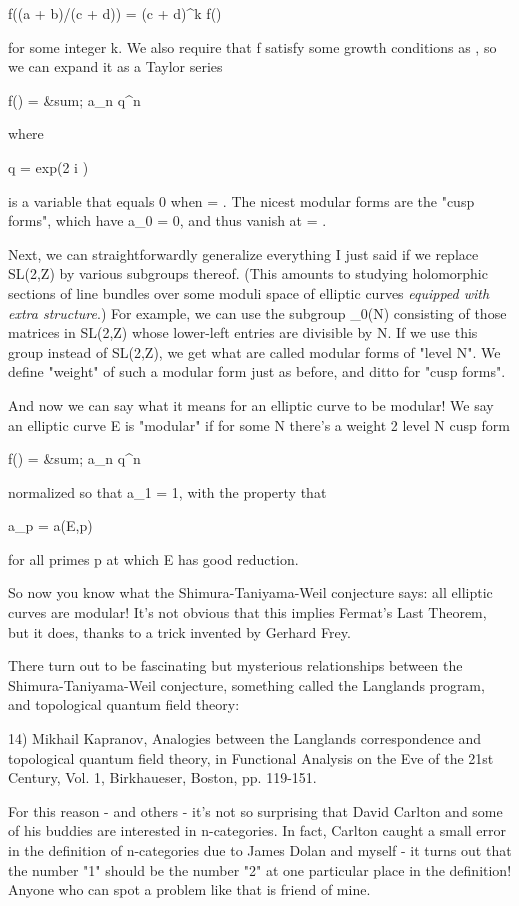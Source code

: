 f((a \tau  + b)/(c \tau  + d)) = (c \tau  + d)^{k} f(\tau )

for some integer k.   We also require that f satisfy some growth 
conditions as \tau  \to  \infty , so we can expand it as a Taylor series

f(\tau ) = &sum; a_{n} q^{n}

where 

q = exp(2 \pi  i \tau )

is a variable that equals 0 when \tau  = \infty .  The nicest modular
forms are the "cusp forms", which have a_{0} = 0,
and thus vanish at \tau  = \infty .

Next, we can straightforwardly generalize everything I just said if we
replace SL(2,Z) by various subgroups thereof.  (This amounts to
studying holomorphic sections of line bundles over some moduli space
of elliptic curves \emph{equipped with extra structure}.)  For
example, we can use the subgroup \Gamma _{0}(N) consisting of those
matrices in SL(2,Z) whose lower-left entries are divisible by N.  If
we use this group instead of SL(2,Z), we get what are called modular
forms of "level N".  We define "weight" of such a
modular form just as before, and ditto for "cusp forms".

And now we can say what it means for an elliptic curve to be modular!
We say an elliptic curve E is "modular" if for some N
there's a weight 2 level N cusp form

f(\tau ) = &sum; a_{n} q^{n}

normalized so that a_{1} = 1, with the property that

a_{p} = a(E,p)

for all primes p at which E has good reduction.  

So now you know what the Shimura-Taniyama-Weil conjecture says:
all elliptic curves are modular!  It's not obvious that this implies
Fermat's Last Theorem, but it does, thanks to a trick invented by
Gerhard Frey.

There turn out to be fascinating but mysterious relationships between
the Shimura-Taniyama-Weil conjecture, something called the Langlands
program, and topological quantum field theory:

14) Mikhail Kapranov, Analogies between the Langlands correspondence
and topological quantum field theory, in Functional Analysis on the 
Eve of the 21st Century, Vol. 1, Birkhaueser, Boston, pp. 119-151.

For this reason - and others - it's not so surprising that David
Carlton and some of his buddies are interested in n-categories.  In
fact, Carlton caught a small error in the definition of n-categories
due to James Dolan and myself - it turns out that the number
"1" should be the number "2" at one particular
place in the definition!  Anyone who can spot a problem like that is
friend of mine.

